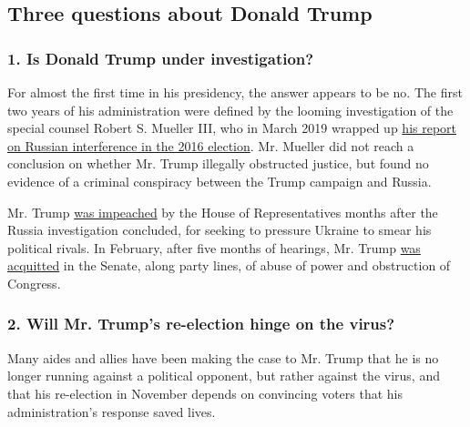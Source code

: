 \hypertarget{three-questions-about-donald-trump}{%
\subsection{Three questions about Donald
Trump}\label{three-questions-about-donald-trump}}

\hypertarget{1-is-donald-trump-under-investigation}{%
\subsubsection{\texorpdfstring{\textbf{1. Is Donald Trump under
investigation?}}{1. Is Donald Trump under investigation?}}\label{1-is-donald-trump-under-investigation}}

For almost the first time in his presidency, the answer appears to be
no. The first two years of his administration were defined by the
looming investigation of the special counsel Robert S. Mueller III, who
in March 2019 wrapped up
\href{https://www.nytimes.com/2019/03/24/us/politics/mueller-report-summary.html}{his
report on Russian interference in the 2016 election}. Mr. Mueller did
not reach a conclusion on whether Mr. Trump illegally obstructed
justice, but found no evidence of a criminal conspiracy between the
Trump campaign and Russia.

Mr. Trump
\href{https://www.nytimes.com/2019/12/18/us/politics/trump-impeached.html}{was
impeached} by the House of Representatives months after the Russia
investigation concluded, for seeking to pressure Ukraine to smear his
political rivals. In February, after five months of hearings, Mr. Trump
\href{https://www.nytimes.com/2020/02/05/us/politics/trump-acquitted-impeachment.html}{was
acquitted} in the Senate, along party lines, of abuse of power and
obstruction of Congress.

\hypertarget{2-will-mr-trumps-re-election-hinge-on-the-virus}{%
\subsubsection{\texorpdfstring{\textbf{2. Will Mr. Trump's re-election
hinge on the
virus?}}{2. Will Mr. Trump's re-election hinge on the virus?}}\label{2-will-mr-trumps-re-election-hinge-on-the-virus}}

Many aides and allies have been making the case to Mr. Trump that he is
no longer running against a political opponent, but rather against the
virus, and that his re-election in November depends on convincing voters
that his administration's response saved lives.

